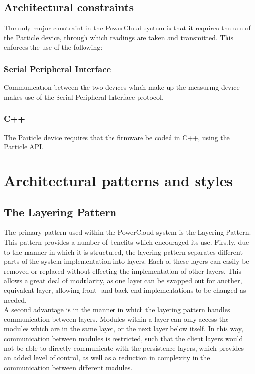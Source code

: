 \documentclass{article}
\begin{document}
	\subsection{Architectural constraints}
	
	The only major constraint in the PowerCloud system is that it 
	requires the use of the Particle device, through which readings are 
	taken and transmitted. This enforces the use of the following:\\
	
	\subsubsection{Serial Peripheral Interface}
	Communication between the two devices which make up the measuring 
	device makes use of the Serial Peripheral Interface protocol.\\
	
	\subsubsection{C++}
	The Particle device requires that the firmware be coded in C++, using 
	the Particle API.\\

\newpage

\section{Architectural patterns and styles}

	\subsection{The Layering Pattern}
	
	The primary pattern used within the PowerCloud system is the Layering 
	Pattern. This pattern provides a number of benefits which encouraged its 
	use. Firstly, due to the manner in which it is structured, the layering 
	pattern separates different parts of the system implementation into 
	layers. Each of these layers can easily be removed or replaced without 
	effecting the implementation of other layers. This allows a great deal of 
	modularity, as one layer can be swapped out for another, equivalent 
	layer, allowing front- and back-end implementations to be changed as 
	needed.\\
	
	A second advantage is in the manner in which the layering pattern handles 
	communication between layers. Modules within a layer can only access the 
	modules which are in the same layer, or the next layer below itself. In 
	this way, communication between modules is restricted, such that the 
	client layers would not be able to directly communicate with the 
	persistence layers, which provides an added level of control, as well as 
	a reduction in complexity in the communication between different 
	modules.\\
	
\end{document}
